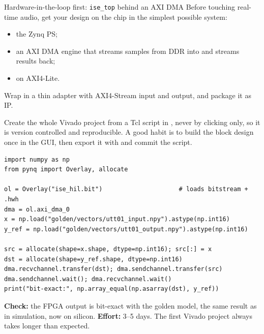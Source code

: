 \begin{stepbox}[label=st:fpga:dma]{Hardware-in-the-loop first: \texttt{ise\_top} behind an AXI DMA}
Before touching real-time audio, get your design on the chip in the simplest
possible system:
\begin{itemize}
  \item the Zynq PS;
  \item an AXI DMA engine that streams samples from DDR into  and
        streams results back;
  \item {} on AXI4-Lite.
\end{itemize}
Wrap  in a thin adapter with AXI4-Stream input and output, and
package it as IP.

Create the whole Vivado project from a Tcl script in
, never by clicking only, so it is version
controlled and reproducible. A good habit is to build the block design once in
the GUI, then export it with  and commit the script.

\begin{lstlisting}[style=py,caption={Hardware-in-the-loop test from a PYNQ notebook (API names as in current PYNQ; check your version).}]
import numpy as np
from pynq import Overlay, allocate

ol = Overlay("ise_hil.bit")                     # loads bitstream + .hwh
dma = ol.axi_dma_0
x = np.load("golden/vectors/utt01_input.npy").astype(np.int16)
y_ref = np.load("golden/vectors/utt01_output.npy").astype(np.int16)

src = allocate(shape=x.shape, dtype=np.int16); src[:] = x
dst = allocate(shape=y_ref.shape, dtype=np.int16)
dma.recvchannel.transfer(dst); dma.sendchannel.transfer(src)
dma.sendchannel.wait(); dma.recvchannel.wait()
print("bit-exact:", np.array_equal(np.asarray(dst), y_ref))
\end{lstlisting}

\textbf{Check:} the FPGA output is bit-exact with the golden model, the same
result as in simulation, now on silicon. \textbf{Effort:} 3--5 days. The first
Vivado project always takes longer than expected.
\end{stepbox}

